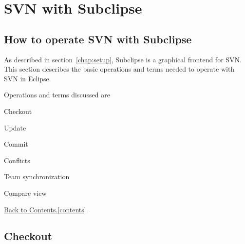 \documentclass[11pt, oneside]{scrartcl}
\newcommand{\backtocontents}{\hyperref[contents]{Back to Contents.\ref*{contents}}}
\begin{document}
   
   
\section{SVN with Subclipse} \label{chap:subclipse}
 

  
\subsection{How to operate SVN with Subclipse}

As described in section~\ref{chap:setup}, Subclipse is a graphical frontend for
SVN. This section describes the basic operations and terms needed to operate
with SVN in Eclipse.

Operations and terms discussed are
\begin{itemize*}
\item Checkout
\item Update
\item Commit
\item Conflicts
\item Team synchronization
\item Compare view
\end{itemize*}

\backtocontents


\subsection{Checkout}
\end{document}
